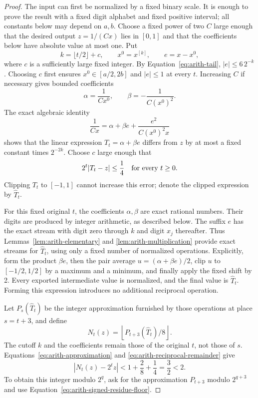 \begin{proof}
The input can first be normalized by a fixed binary scale.  It is
enough to prove the result with a fixed digit alphabet and fixed
positive interval; all constants below may depend on $a,b$.
Choose a fixed power of two $C$ large enough that the desired output
$z=1/(Cx)$ lies in $[0,1]$ and that the coefficients below have
absolute value at most one.  Put
\[
 k=\lfloor t/2\rfloor+c,\qquad x^0=x^{[k]},\qquad e=x-x^0,
\]
where $c$ is a sufficiently large fixed integer.  By
Equation~\eqref{eq:arith-tail}, $|e|\leq 6\,2^{-k}$.  Choosing $c$
first ensures $x^0\in[a/2,2b]$ and $|e|\leq1$ at every $t$.
Increasing $C$ if necessary gives bounded coefficients
\[
 \alpha=\frac1{Cx^0},\qquad \beta=-\frac1{C(x^0)^2}.
\]
The exact algebraic identity
\begin{equation}
 \frac1{Cx}=\alpha+\beta e+
               \frac{e^2}{C(x^0)^2x}
 \label{eq:arith-reciprocal-taylor}
\end{equation}
shows that the linear expression $T_t=\alpha+\beta e$ differs
from $z$ by at most a fixed constant times $2^{-2k}$.
Choose $c$ large enough that
\begin{equation}
 2^t|T_t-z|\leq\frac14
 \quad\hbox{for every }t\geq0.
 \label{eq:arith-reciprocal-remainder}
\end{equation}
Clipping $T_t$ to $[-1,1]$ cannot increase this error; denote the
clipped expression by $\widehat T_t$.

For this fixed original $t$, the coefficients $\alpha,\beta$ are
exact rational numbers.  Their digits are produced by integer
arithmetic, as described below.  The suffix $e$ has the exact stream
with digit zero through $k$ and digit $x_j$ thereafter.  Thus
Lemmas~\ref{lem:arith-elementary} and
\ref{lem:arith-multiplication} provide exact streams for
$\widehat T_t$, using only a fixed number of normalized operations.
Explicitly, form the product $\beta e$, then the pair average
$u=(\alpha+\beta e)/2$, clip $u$ to $[-1/2,1/2]$ by a maximum
and a minimum, and finally apply the fixed shift by 2.  Every
exported intermediate value is normalized, and the final value is
$\widehat T_t$.  Forming this expression introduces no additional
reciprocal operation.

Let $P_s(\widehat T_t)$ be the integer approximation furnished by
those operations at place $s=t+3$, and define
\begin{equation}
 N_t(z)=\left\lfloor P_{t+3}(\widehat T_t)/8\right\rfloor.
 \label{eq:arith-reciprocal-approximation}
\end{equation}
The cutoff $k$ and the coefficients remain those of the original $t$,
not those of $s$.  Equations~\eqref{eq:arith-approximation} and
\eqref{eq:arith-reciprocal-remainder} give
\[
 |N_t(z)-2^tz|<1+\frac28+\frac14=\frac32<2.
\]
To obtain this integer modulo $2^q$, ask for the approximation
$P_{t+3}$ modulo $2^{q+3}$ and use
Equation~\eqref{eq:arith-signed-residue-floor}.


\end{proof}
